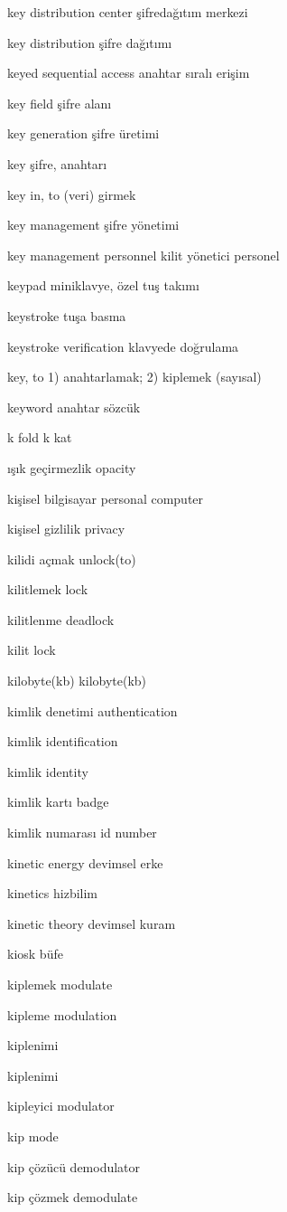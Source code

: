 \documentclass[12pt,fleqn]{article}\usepackage{../../common}
\begin{document}
key distribution center şifredağıtım merkezi

key distribution şifre dağıtımı

keyed sequential access anahtar sıralı erişim

key field şifre alanı

key generation şifre üretimi

key şifre, anahtarı

key in, to (veri) girmek

key management şifre yönetimi

key management personnel kilit yönetici personel

keypad miniklavye, özel tuş takımı

keystroke tuşa basma

keystroke verification klavyede doğrulama

key, to 1) anahtarlamak; 2) kiplemek (sayısal)

keyword anahtar sözcük

k fold k kat

ışık geçirmezlik opacity

kişisel bilgisayar personal computer

kişisel gizlilik privacy

kilidi açmak unlock(to)

kilitlemek lock

kilitlenme deadlock

kilit lock

kilobyte(kb) kilobyte(kb)

kimlik denetimi authentication

kimlik identification

kimlik identity

kimlik kartı badge

kimlik numarası id number

kinetic energy devimsel erke

kinetics hizbilim

kinetic theory devimsel kuram

kiosk büfe

kiplemek modulate

kipleme modulation

kiplenimi

kiplenimi

kipleyici modulator

kip mode

kip çözücü demodulator

kip çözmek demodulate
\end{document}
